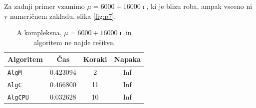 \documentclass[12pt,a4paper]{amsart}
\theoremstyle{definition}
\theoremstyle{plain}
\begin{document}
Za zadnji primer vzamimo $\mu = 6000+16000\imath$, ki je blizu roba, ampak vseeno ni v numeričnem zakladu, slika \ref{fig:p7}.


\begin{table}[H]
\caption{A kompleksna, $\mu = 6000+16000\imath$ in algoritem ne najde rešitve.}
\begin{tabular}{|l|c|c|c|}
\hline
Algoritem & Čas & Koraki & Napaka\\
\hline
\hline
\verb+AlgM+ &0.423094 &2&Inf\\
\hline
\verb+AlgC+ &0.466800&11&Inf \\
\hline
\verb+AlgCPU+ &0.032628&10&Inf  \\
\hline
\end{tabular}

\label{t10}
\end{table}
\end{document}
